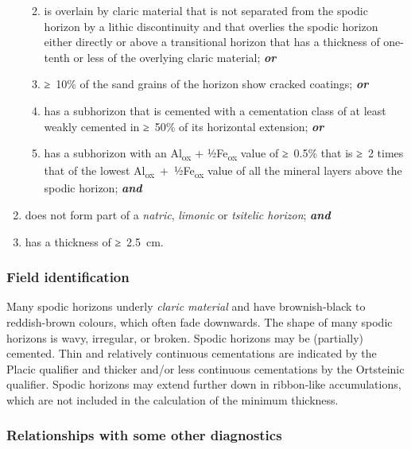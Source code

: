 \documentclass[
  letterpaper,
  DIV=11,
  numbers=noendperiod]{scrreprt}
\providecommand{\tightlist}{%
  \setlength{\itemsep}{0pt}\setlength{\parskip}{0pt}}\usepackage{longtable,booktabs,array}
\begin{document}
\begin{enumerate}
  \begin{enumerate}
  \def\labelenumii{\alph{enumii}.}
  \tightlist
  \item
    is overlain by claric material that is not separated from the spodic
    horizon by a lithic discontinuity and that overlies the spodic
    horizon either directly or above a transitional horizon that has a
    thickness of one-tenth or less of the overlying claric material;
    \textbf{\emph{or}}
  \item
    ≥~10\% of the sand grains of the horizon show cracked coatings;
    \textbf{\emph{or}}
  \item
    has a subhorizon that is cemented with a cementation class of at
    least weakly cemented in ≥~50\% of its horizontal extension;
    \textbf{\emph{or}}
  \item
    has a subhorizon with an Al\textsubscript{ox} +
    ½Fe\textsubscript{ox} value of ≥~0.5\% that is ≥~2 times that of the
    lowest Al\textsubscript{ox}~+~½Fe\textsubscript{ox} value of all the
    mineral layers above the spodic horizon; \textbf{\emph{and}}
  \end{enumerate}
\item
  does not form part of a \emph{natric}, \emph{limonic} or
  \emph{tsitelic horizon}; \textbf{\emph{and}}
\item
  has a thickness of ≥~2.5~cm.
\end{enumerate}

\hypertarget{field-identification-26}{%
\subsubsection{Field identification}\label{field-identification-26}}

Many spodic horizons underly \emph{claric material} and have
brownish-black to reddish-brown colours, which often fade downwards. The
shape of many spodic horizons is wavy, irregular, or broken. Spodic
horizons may be (partially) cemented. Thin and relatively continuous
cementations are indicated by the Placic qualifier and thicker and/or
less continuous cementations by the Ortsteinic qualifier. Spodic
horizons may extend further down in ribbon-like accumulations, which are
not included in the calculation of the minimum thickness.

\hypertarget{relationships-with-some-other-diagnostics-33}{%
\subsubsection{Relationships with some other
diagnostics}\label{relationships-with-some-other-diagnostics-33}}
\end{document}

